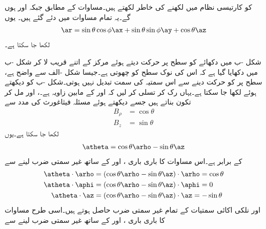  کو کارتیسی نظام میں لکھنے کی خاطر  لکھتے ہیں۔مساوات  کے مطابق  جبکہ  اور  ہوں گے۔یہ تمام  مساوات  میں دئے گئے ہیں۔ یوں 
\begin{align}
\ar=\sin \theta \cos \phi \ax+\sin \theta \sin \phi \ay+\cos \theta \az
\end{align}
لکھا جا سکتا ہے۔

شکل -ب میں دکھائے  کو  سطح پر حرکت دیتے ہوئے  مرکز کے اتنے قریب لا کر شکل -ب میں دکھایا گیا ہے کہ اس کی نوک  سطح کو چھوتی ہے۔جیسا شکل -الف سے واضح ہے،   سطح پر  کو حرکت دینے سے اس سمتیہ کی سمت تبدیل نہیں ہوتی۔شکل -ب کو دیکھتے ہوئے  لکھا جا سکتا ہے۔یہاں رک کر  تسلی کر لیں کہ  اور  کے مابین زاویہ  ہے۔،  اور  مل کر تکون بناتے ہیں جسے دیکھتے ہوئے مسئلہ فیثاغورث کی مدد سے
\begin{align*}
B_\rho&=\cos \theta\\
B_z&=\sin \theta
\end{align*}
لکھا جا سکتا ہے۔یوں
\begin{align}\label{مساوات_سمتیہ_کروی_اکائی_تھیٹا}
\atheta=\cos \theta \arho-\sin \theta \az
\end{align}
کے برابر ہے۔اس مساوات کا باری باری ،  اور  کے ساتھ غیر سمتی ضرب لینے سے
\begin{gather}
\begin{aligned}\label{مساوات_سمتیہ_کروی_تھیٹا_نلکی_اکائی_غیر_سمتی_ضرب}
\atheta \cdot \arho&=(\cos \theta \arho-\sin \theta \az) \cdot \arho=\cos \theta\\
\atheta \cdot \aphi&=(\cos \theta \arho-\sin \theta \az) \cdot \aphi=0\\
\atheta \cdot \az&=(\cos \theta \arho-\sin \theta \az) \cdot \az=-\sin \theta
\end{aligned}
\end{gather}
 اور نلکی اکائی سمتیات کے  تمام غیر سمتی ضرب حاصل ہوتے ہیں۔اسی طرح مساوات  کا باری باری ،  اور  کے ساتھ غیر سمتی ضرب لینے سے
